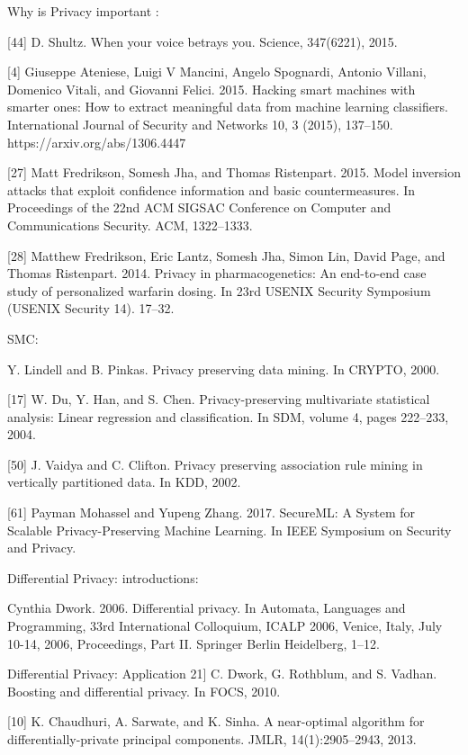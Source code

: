 \documentclass[conference]{IEEEtran}
\begin{document}
Why is Privacy important : 

[44]
D. Shultz. When your voice betrays you. Science, 347(6221),
2015.

[4] Giuseppe Ateniese, Luigi V Mancini, Angelo Spognardi, Antonio Villani,
Domenico Vitali, and Giovanni Felici. 2015. Hacking smart machines with
smarter ones: How to extract meaningful data from machine learning classifiers.
International Journal of Security and Networks 10, 3 (2015), 137–150.
https://arxiv.org/abs/1306.4447

[27] Matt Fredrikson, Somesh Jha, and Thomas Ristenpart. 2015. Model inversion
attacks that exploit confidence information and basic countermeasures. In Proceedings
of the 22nd ACM SIGSAC Conference on Computer and Communications
Security. ACM, 1322–1333.

[28] Matthew Fredrikson, Eric Lantz, Somesh Jha, Simon Lin, David Page, and Thomas
Ristenpart. 2014. Privacy in pharmacogenetics: An end-to-end case study of
personalized warfarin dosing. In 23rd USENIX Security Symposium (USENIX
Security 14). 17–32.



SMC:


Y. Lindell and B. Pinkas. Privacy preserving data mining. In
CRYPTO, 2000.

[17] W. Du, Y. Han, and S. Chen. Privacy-preserving multivariate
statistical analysis: Linear regression and classification. In
SDM, volume 4, pages 222–233, 2004.

[50] J. Vaidya and C. Clifton. Privacy preserving association rule
mining in vertically partitioned data. In KDD, 2002.

[61] Payman Mohassel and Yupeng Zhang. 2017. SecureML: A System for Scalable
Privacy-Preserving Machine Learning. In IEEE Symposium on Security and Privacy.


Differential Privacy: introductions:


Cynthia Dwork. 2006. Differential privacy. In Automata, Languages and Programming,
33rd International Colloquium, ICALP 2006, Venice, Italy, July 10-14, 2006,
Proceedings, Part II. Springer Berlin Heidelberg, 1–12.

Differential Privacy: Application
21] C. Dwork, G. Rothblum, and S. Vadhan. Boosting and
differential privacy. In FOCS, 2010.

[10] K. Chaudhuri, A. Sarwate, and K. Sinha. A near-optimal
algorithm for differentially-private principal components.
JMLR, 14(1):2905–2943, 2013.
\end{document}
